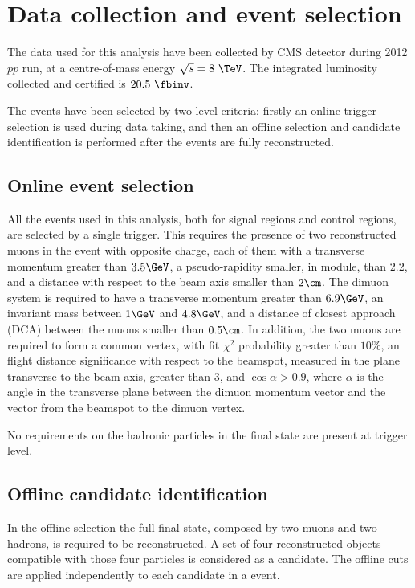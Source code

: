 \section{Data collection and event selection}\label{sec:selection}

The data used for this analysis have been collected by CMS detector during 2012 $pp$ run, at a centre-of-mass energy $\sqrt{s}=8~\TeV$.
The integrated luminosity collected and certified is $20.5~\fbinv$.

The events have been selected by two-level criteria: firstly an online trigger selection is used during data taking, and then an offline selection and candidate identification is performed after the events are fully reconstructed.

\subsection{Online event selection}
\label{sec:onsel}
All the events used in this analysis, both for signal regions and control regions, are selected by a single trigger. This requires the presence of two reconstructed muons in the event with opposite charge, each of them with a transverse momentum greater than $3.5\GeV$, a pseudo-rapidity smaller, in module, than $2.2$, and a distance with respect to the beam axis smaller than $2\cm$. The dimuon system is required to have a transverse momentum greater than $6.9\GeV$, an invariant mass between $1\GeV$ and $4.8\GeV$, and a distance of closest approach (DCA) between the muons smaller than $0.5\cm$. In addition, the two muons are required to form a common vertex, with fit $\chi^2$ probability greater than $10\%$, an flight distance significance with respect to the beamspot, measured in the plane transverse to the beam axis, greater than 3, and $\cos{\alpha}>0.9$, where $\alpha$ is the angle in the transverse plane between the dimuon momentum vector and the vector from the beamspot to the dimuon vertex.

No requirements on the hadronic particles in the final state are present at trigger level.

\subsection{Offline candidate identification}
\label{sec:offsel}

In the offline selection the full final state, composed by two muons and two hadrons, is required to be reconstructed. A set of four reconstructed objects compatible with those four particles is considered as a candidate. The offline cuts are applied independently to each candidate in a event.

